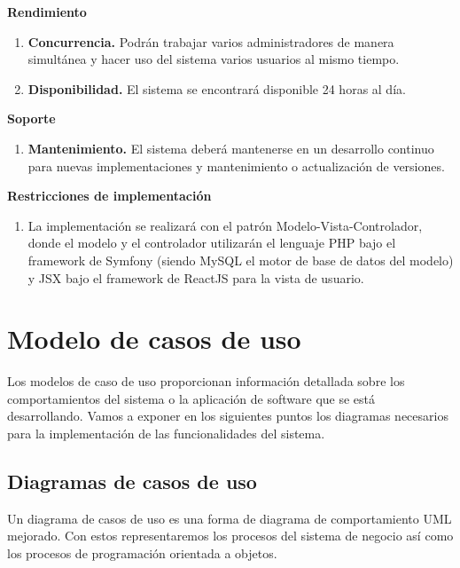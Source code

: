 \textbf{Rendimiento}

\begin{enumerate}[leftmargin=2.4cm,start=7,label={\bfseries RNF-\arabic*.}]
    \item \textbf{Concurrencia.} Podrán trabajar varios administradores de manera simultánea y hacer uso del sistema varios usuarios al mismo tiempo.
    \item \textbf{Disponibilidad.} El sistema se encontrará disponible 24 horas al día.
\end{enumerate}


\textbf{Soporte}

\begin{enumerate}[leftmargin=2.4cm,start=10,label={\bfseries RNF-\arabic*.}]
    \item \textbf{Mantenimiento.} El sistema deberá mantenerse en un desarrollo continuo para nuevas implementaciones y mantenimiento o actualización de versiones.
\end{enumerate}


\textbf{Restricciones de implementación}
    
\begin{enumerate}[leftmargin=2.4cm,start=13,label={\bfseries RNF-\arabic*.}]
    \item La implementación se realizará con el patrón Modelo-Vista-Controlador, donde el modelo y el controlador utilizarán el lenguaje PHP bajo el framework de Symfony (siendo MySQL el motor de base de datos del modelo) y JSX bajo el framework de ReactJS para la vista de usuario.
\end{enumerate}


\section{Modelo de casos de uso}

Los modelos de caso de uso proporcionan información detallada sobre los comportamientos del sistema o la aplicación de software que se está desarrollando. Vamos a exponer en los siguientes puntos los diagramas necesarios para la implementación de las funcionalidades del sistema.

\subsection{Diagramas de casos de uso}

Un diagrama de casos de uso es una forma de diagrama de comportamiento UML mejorado. Con estos representaremos
los procesos del sistema de negocio así como los procesos de programación orientada a objetos.\\

